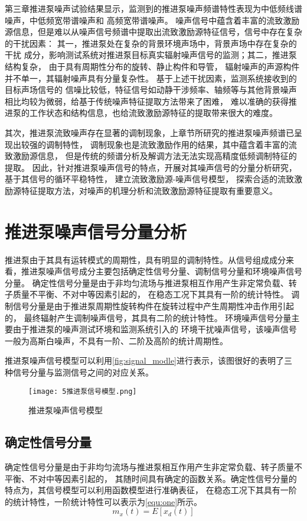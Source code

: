 第三章推进泵噪声试验结果显示，监测到的推进泵噪声频谱特性表现为中低频线谱噪声，中低频宽带谱噪声和
高频宽带谱噪声。
噪声信号中蕴含着丰富的流致激励源信息，但是难以从噪声信号频谱中提取出流致激励源特征信号，信号中存在复杂的干扰因素：
其一，推进泵处在复杂的背景环境声场中，背景声场中存在复杂的干扰
成分，影响测试系统对推进泵目标真实辐射噪声信号的监测；其二，推进泵结构复杂，
由于具有周期性分布的旋转、静止构件和导管，
辐射噪声的声源构件并不单一，其辐射噪声具有分量复杂性。
基于上述干扰因素，监测系统接收到的目标声场信号的
信噪比较低，特征信号如动静干涉频率、轴频等与其他背景噪声相比均较为微弱，给基于传统噪声特征提取方法带来了困难，
难以准确的获得推进泵的工作状态和结构信息，也给流致激励源特征的提取带来很大的难度。

其次，推进泵流致噪声存在显著的调制现象，上章节所研究的推进泵噪声频谱已呈现出较强的调制特性，
调制现象也是流致激励作用的结果，其中蕴含着丰富的流致激励源信息，
但是传统的频谱分析及解调方法无法实现高精度低频调制特征的提取。
因此，针对推进泵噪声信号的特点，开展对其噪声信号的分量分析研究，
基于其信号的循环平稳特性，
建立流致激励源-噪声信号模型，
探索合适的流致激励源特征提取方法，对噪声的机理分析和流致激励源特征提取有重要意义。
\section{推进泵噪声信号分量分析}
推进泵由于其具有运转模式的周期性，具有明显的调制特性。从信号组成成分来看，推进泵噪声信号成分主要包括确定性信号分量、调制信号分量和环境噪声信号分量。
确定性信号分量是由于非均匀流场与推进泵相互作用产生非定常负载、转子质量不平衡、不对中等因素引起的，
在稳态工况下其具有一阶的统计特性。
调制信号分量是由于推进泵周期性旋转构件在旋转过程中产生周期性冲击作用引起的，
最终辐射产生调制噪声信号，其具有二阶的统计特性。
环境噪声信号分量主要由于推进泵的噪声测试环境和监测系统引入的
环境干扰噪声信号，该噪声信号一般为高斯白噪声，不具有一阶、二阶及高阶的统计周期性。

推进泵噪声信号模型可以利用\autoref{fig:signal_modle}进行表示，该图很好的表明了三
种信号分量与监测信号之间的对应关系。
\begin{figure}[htbp]
    \centering
    \texttt{[image: 5推进泵信号模型.png]}
    \caption{\label{fig:signal_modle}推进泵噪声信号模型}
\end{figure}

\subsection{确定性信号分量}
确定性信号分量是由于非均匀流场与推进泵相互作用产生非定常负载、转子质量不平衡、不对中等因素引起的，
其随时间具有确定的函数关系。确定性信号分量的特点为，其信号模型可以利用函数模型进行准确表征，
在稳态工况下其具有一阶的统计特性，一阶统计特性可以表示为\autoref{equ:one}所示。
\begin{equation}
    \label{equ:one}
    m_{x}\left ( t \right ) =E\left [ x_{d}\left ( t   \right )  \right ]
\end{equation}

